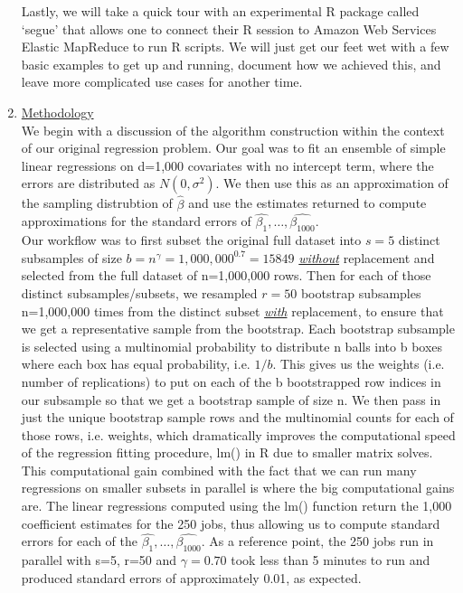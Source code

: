 \documentclass[a4paper, 11pt]{report}
\begin{document}
\begin{enumerate}
	    	Lastly, we will take a quick tour with an experimental R package called `segue' that allows one to connect their R session to Amazon Web Services Elastic MapReduce to run R scripts. We will just get our feet wet with a few basic examples to get up and running, document how we achieved this, and leave more complicated use cases for another time.  \\
	    
	    \item \Large\underline{Methodology}\normalsize \\

			We begin with a discussion of the algorithm construction within the context of our original regression problem.  Our goal was to fit an ensemble of simple linear regressions on d=1,000 covariates with no intercept term, where the errors are distributed as $N(0,\sigma^2)$.  We then use this as an approximation of the sampling distrubtion of $\widehat{\beta}$ and use the estimates returned to compute approximations for the standard errors of $\widehat{\beta_1}, \ldots, \widehat{\beta_{1000}}$.  \\
			
			Our workflow was to first subset the original full dataset into $s=5$ distinct subsamples of size $b = n^{\gamma} = 1,000,000^{0.7} = 15849$ \textit{\underline{without}} replacement and selected from the full dataset of n=1,000,000 rows.  Then for each of those distinct subsamples/subsets, we resampled $r=50$ bootstrap subsamples n=1,000,000 times from the distinct subset \textit{\underline{with}} replacement, to ensure that we get a representative sample from the bootstrap.  Each bootstrap subsample is selected using a multinomial probability to distribute n balls into b boxes where each box has equal probability, i.e. $1/b$.  This gives us the weights (i.e. number of replications) to put on each of the b bootstrapped row indices in our subsample so that we get a bootstrap sample of size n.  We then pass in just the unique bootstrap sample rows and the multinomial counts for each of those rows, i.e. weights, which dramatically improves the computational speed of the regression fitting procedure, lm() in R due to smaller matrix solves.  This computational gain combined with the fact that we can run many regressions on smaller subsets in parallel is where the big computational gains are.  The linear regressions computed using the lm() function return the 1,000 coefficient estimates for the 250 jobs, thus allowing us to compute standard errors for each of the $\widehat{\beta_1}, \ldots, \widehat{\beta_{1000}}$.  As a reference point, the 250 jobs run in parallel with s=5, r=50 and $\gamma = 0.70$ took less than 5 minutes to run and produced standard errors of approximately 0.01, as expected. \\
			

\end{enumerate}
\end{document}
